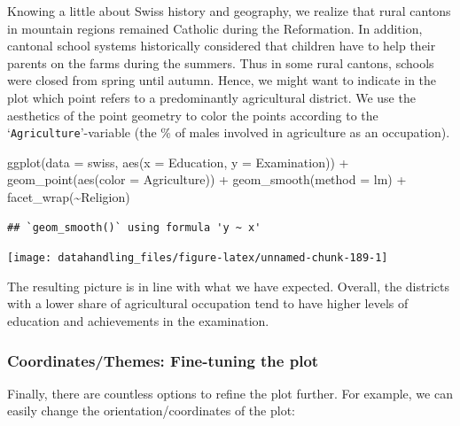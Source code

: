 \documentclass[
  12pt,
]{style/krantz}
\newenvironment{Shaded}{\begin{snugshade}}{\end{snugshade}}
\newcommand{\AttributeTok}[1]{\textcolor[rgb]{0.77,0.63,0.00}{#1}}
\newcommand{\FunctionTok}[1]{\textcolor[rgb]{0.00,0.00,0.00}{#1}}
\newcommand{\NormalTok}[1]{#1}
\newcommand{\SpecialCharTok}[1]{\textcolor[rgb]{0.00,0.00,0.00}{#1}}
\newcommand{\StringTok}[1]{\textcolor[rgb]{0.31,0.60,0.02}{#1}}
\begin{document}
Knowing a little about Swiss history and geography, we realize that rural cantons in mountain regions remained Catholic during the Reformation. In addition, cantonal school systems historically considered that children have to help their parents on the farms during the summers. Thus in some rural cantons, schools were closed from spring until autumn. Hence, we might want to indicate in the plot which point refers to a predominantly agricultural district. We use the aesthetics of the point geometry to color the points according to the `\texttt{Agriculture}'-variable (the \% of males involved in agriculture as an occupation).

\begin{Shaded}
\begin{Highlighting}[]
\FunctionTok{ggplot}\NormalTok{(}\AttributeTok{data =}\NormalTok{ swiss, }\FunctionTok{aes}\NormalTok{(}\AttributeTok{x =}\NormalTok{ Education, }\AttributeTok{y =}\NormalTok{ Examination)) }\SpecialCharTok{+}
     \FunctionTok{geom\_point}\NormalTok{(}\FunctionTok{aes}\NormalTok{(}\AttributeTok{color =}\NormalTok{ Agriculture)) }\SpecialCharTok{+}
     \FunctionTok{geom\_smooth}\NormalTok{(}\AttributeTok{method =} \StringTok{\textquotesingle{}lm\textquotesingle{}}\NormalTok{) }\SpecialCharTok{+}
     \FunctionTok{facet\_wrap}\NormalTok{(}\SpecialCharTok{\textasciitilde{}}\NormalTok{Religion)}
\end{Highlighting}
\end{Shaded}

\begin{verbatim}
## `geom_smooth()` using formula 'y ~ x'
\end{verbatim}

\texttt{[image: datahandling\_files/figure-latex/unnamed-chunk-189-1]}

The resulting picture is in line with what we have expected. Overall, the districts with a lower share of agricultural occupation tend to have higher levels of education and achievements in the examination.

\hypertarget{coordinatesthemes-fine-tuning-the-plot}{%
\subsubsection{Coordinates/Themes: Fine-tuning the plot}\label{coordinatesthemes-fine-tuning-the-plot}}

Finally, there are countless options to refine the plot further. For example, we can easily change the orientation/coordinates of the plot:
\end{document}
